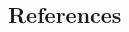 \documentclass[final]{beamer}
\begin{document}
\begin{frame}[t]
\begin{multicols}{3}


\section{References}

\printbibliography[heading=none]


\end{multicols}

\end{frame}
\end{document}
